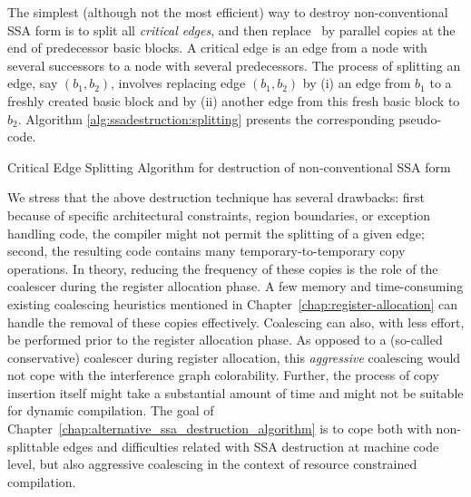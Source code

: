 The simplest (although not the most efficient) way to destroy non-conventional SSA form is to split all \textit{critical edges}, and then replace \phifuns\ by parallel copies at the end of predecessor basic blocks.
A critical edge is an edge from a node with several successors to a node with several predecessors.
The process of splitting an edge, say $(b_1,b_2)$,
involves replacing edge $(b_1, b_2)$ by (i) an
edge from $b_1$ to a freshly created basic block 
and by (ii) another edge from this fresh basic block to $b_2$. 
Algorithm \ref{alg:ssadestruction:splitting} presents
the corresponding pseudo-code.

\begin{algorithm}
\caption{\label{alg:ssadestruction:splitting}Critical Edge Splitting Algorithm for destruction of non-conventional SSA form}
\end{algorithm}



We stress that the above destruction technique has several drawbacks: first because of specific architectural constraints, region boundaries, or exception handling code, the compiler might not permit the splitting of a given edge; second, the resulting code contains many temporary-to-temporary copy operations. In theory, reducing the frequency of these copies is the role of the coalescer during the register allocation phase. A few memory and time-consuming existing coalescing heuristics mentioned in Chapter~\ref{chap:register-allocation} can handle the removal of these copies effectively. Coalescing can also, with less effort, be performed prior to the register allocation phase. As opposed to a (so-called conservative) coalescer during register allocation, this \emph{aggressive} coalescing would not cope with the interference graph colorability. Further, the process of copy insertion itself might take a substantial amount of time and might not be suitable for dynamic compilation. The goal of Chapter~\ref{chap:alternative_ssa_destruction_algorithm} is to cope both with non-splittable edges and difficulties related with SSA destruction at machine code level, but also aggressive coalescing in the context of resource constrained compilation.

